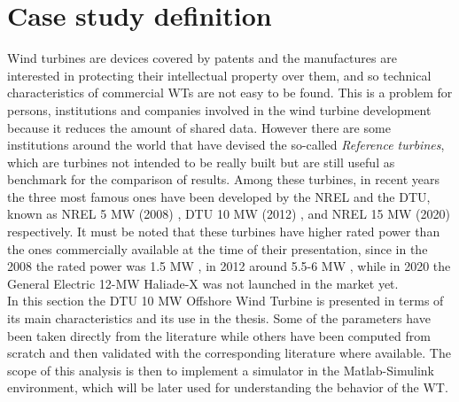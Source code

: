\newpage
\section{Case study definition}\label{sec:c_10MW_OWT}
Wind turbines are devices covered by patents and the manufactures are interested in protecting their intellectual property over them, and so technical characteristics of commercial \acrshort{WTs} are not easy to be found. This is a problem for persons, institutions and companies involved in the wind turbine development because it reduces the amount of shared data. However there are some institutions around the world that have devised the so-called \textit{Reference turbines}, which are turbines not intended to be really built but are still useful as benchmark for the comparison of results. Among these turbines, in recent years the three most famous ones have been developed by the \acrfull{NREL} and the \acrfull{DTU}, known as NREL 5 MW (2008) \cite{NREL_5MW_reference}, DTU 10 MW (2012) \cite{DTU_Wind_Energy_Report-I-0092}, and NREL 15 MW (2020) \cite{NREL_15MW} respectively. It must be noted that these turbines have higher rated power than the ones commercially available at the time of their presentation, since in the 2008 the rated power was 1.5 MW \cite{Wind_Energy_Technology_Current_Status_and_RD_Futur}, in 2012 around 5.5-6 MW \cite{European_offshore_statistics_2012}, while in 2020 the General Electric 12-MW Haliade-X was not launched in the market yet. \\
In this section the DTU 10 MW Offshore Wind Turbine is presented in terms of its main characteristics and its use in the thesis. Some of the parameters have been taken directly from the literature while others have been computed from scratch and then validated with the corresponding literature where available. The scope of this analysis is then to implement a simulator in the Matlab-Simulink environment, which will be later used for understanding the behavior of the WT.

